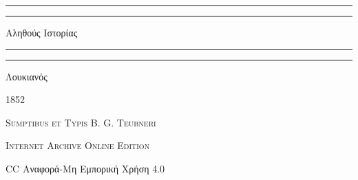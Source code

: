 \documentclass[a4paper, 11pt, oneside, polutonikogreek, german]{article}
\begin{document}
\begin{titlepage} %
	\centering %


	\rule{\textwidth}{1.6pt}\vspace*{-\baselineskip}\vspace*{2pt} %
	\rule{\textwidth}{0.4pt} %
	
	\vspace{1\baselineskip} %
	
	{\Huge Αληθούς Ιστορίας}
	
	\vspace{1\baselineskip} %

	\rule{\textwidth}{0.4pt}\vspace*{-\baselineskip}\vspace{3.2pt} %
	\rule{\textwidth}{1.6pt} %
	
	\vspace{1\baselineskip} %
	
	
	{\Large Λουκιανός}
 
        \vspace{0.5\baselineskip}
	
	\vspace*{1\baselineskip} %
	
        {\scshape \normalsize } %

        \vspace*{\fill}    

	\vspace{1\baselineskip}

	{\small\scshape 1852}
	
	{\small\scshape{Sumptibus et Typis B. G. Teubneri}}
	
	\vspace{0.5\baselineskip} %

        \scshape Internet Archive Online Edition%
    
	{\small CC Αναφορά-Μη Εμπορική Χρήση 4.0} %
\end{titlepage}
\setlength{\parskip}{1mm plus1mm minus1mm}
\clearpage
\end{document}
